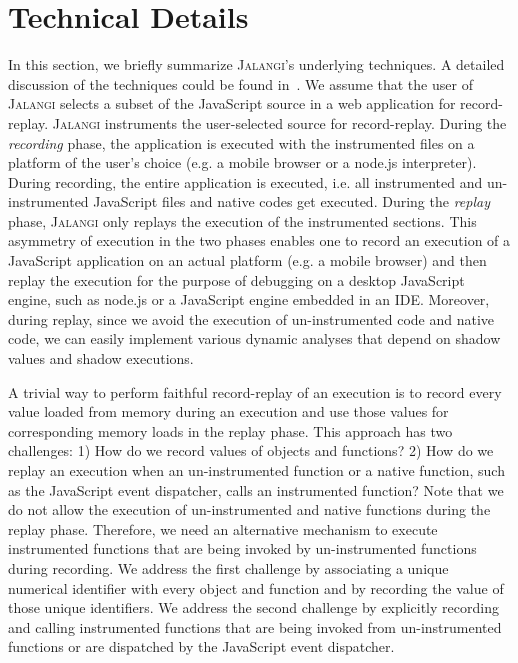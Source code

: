 \documentclass{sig-alternate}
\def\jalangi{\textsc{Jalangi}}
\begin{document}
\section{Technical Details}
\label{sec:technical-details}

In this section, we briefly summarize \jalangi{}'s underlying
techniques.  A detailed discussion of the techniques could be found
in~\cite{SBGKfse13}.  We assume that the user of \jalangi{} selects a
subset of the JavaScript source in a web application for
record-replay.  \jalangi{} instruments the user-selected source for
record-replay.  During the \emph{recording} phase, the application is
executed with the instrumented files on a platform of the user's
choice (e.g. a mobile browser or a node.js interpreter).  During
recording, the entire application is executed, i.e. all instrumented
and un-instrumented JavaScript files and native codes get executed.
During the \emph{replay} phase, \jalangi{} only replays the execution
of the instrumented sections.  This asymmetry of execution in the two
phases enables one to record an execution of a JavaScript application
on an actual platform (e.g. a mobile browser) and then replay the
execution for the purpose of debugging on a desktop JavaScript engine,
such as node.js or a JavaScript engine embedded in an IDE.  Moreover,
during replay, since we avoid the execution of un-instrumented code and
native code, we can easily implement various dynamic analyses that
depend on shadow values and shadow executions.

A trivial way to perform faithful record-replay of an execution is to
record every value loaded from memory during an execution and use
those values for corresponding memory loads in the replay phase.  This
approach has two challenges: 1) How do we record values of objects and
functions?  2) How do we replay an execution when an un-instrumented
function or a native function, such as the JavaScript event
dispatcher, calls an instrumented function?  Note that we do not allow
the execution of un-instrumented and native functions during the
replay phase.  Therefore, we need an alternative mechanism to execute
instrumented functions that are being invoked by un-instrumented
functions during recording.  We address the first challenge by
associating a unique numerical identifier with every object and
function and by recording the value of those unique identifiers.  We
address the second challenge by explicitly recording and calling
instrumented functions that are being invoked from un-instrumented
functions or are dispatched by the JavaScript event dispatcher.
\end{document}
